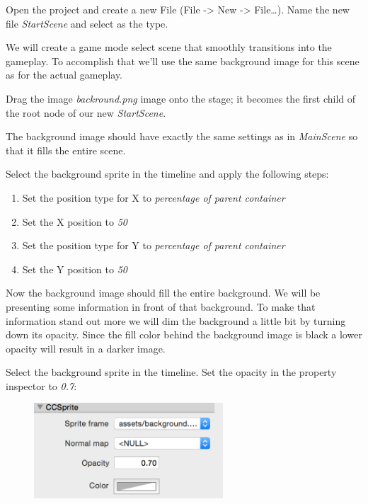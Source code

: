 \begin{leftbar}
Open the \SB{} project and create a new File (File -> New -> File\ldots). Name
the new file \textit{StartScene} and select  as the type.
\end{leftbar}

We will create a game mode select scene that smoothly transitions into the
gameplay. To accomplish that we'll use the same background image for this scene
as for the actual gameplay. 

\begin{leftbar}
Drag the image \textit{backround.png} image onto the stage; it becomes the first
child of the root node of our new \textit{StartScene}.
\end{leftbar}

The background image should have exactly the same settings as in
\textit{MainScene} so that it fills the entire scene.

\begin{leftbar}
Select the background sprite in the timeline and apply the following steps:
\begin{enumerate}
  \item Set the position type for X to \textit{percentage of parent container}
  \item Set the X position to \textit{50}
  \item Set the position type for Y to \textit{percentage of parent container}
  \item Set the Y position to \textit{50}
\end{enumerate}
\end{leftbar}

Now the background image should fill the entire background. We will be
presenting some information in front of that background. To make that
information stand out more we will dim the background a little bit by turning
down its opacity. Since the fill color behind the background image is black a
lower opacity will result in a darker image.

\begin{leftbar}
Select the background sprite in the timeline. Set the opacity in the property
inspector to \textit{0.7}:
\begin{figure}[H]
		\centering
		\includegraphics[width=200pt]{images/Chapter6/opacity_lower.png}
\end{figure}
\end{leftbar}

